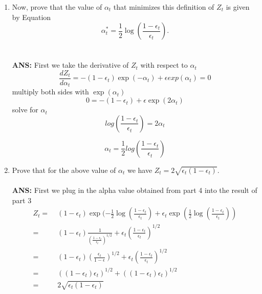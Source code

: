 \documentclass[english]{article}
\begin{document}
\begin{enumerate}
  For this special class of classifiers, first show that the
  normalizer $Z_t$ can be written as:
  \[
  Z_t = (1-\epsilon_t)\exp(-\alpha_t) + \epsilon_t\exp(\alpha_t).
  \]

  {\em Hint}: Consider the sums over correctly and incorrectly
  classified examples separately.
  \\\\
  {\bf ANS: } In this specific binary case that we are considering, if $h_t(x_i) = y_i$,
  \[
  Z_t(i) = \exp(-\alpha_t))
  \]
  else
  \[
  Z_t(i) = \exp(\alpha_t))
  \]
  
  $\epsilon_t$ picks out the terms that the decision stump gets wrong, so the part of Z which the decision stump made a mistake is $\epsilon_t \exp(\alpha_t)$. Since the weights $D$ must sum up to one, the part which the stump is then $(1-\epsilon_t)\exp(-\alpha_t)$. Add these two parts together, we get
  \[
  	Z_t = (1-\epsilon_t)\exp(-\alpha_t) + 			   \epsilon_t\exp(\alpha_t).
  \]


\item  Now, prove that the value of $\alpha_t$ that
  minimizes this definition of $Z_t$ is given by Equation
 \begin{equation}
    \alpha_t^* = \frac{1}{2}\log\left( \frac{1 - \epsilon_t}{\epsilon_t}
    \right).
  \end{equation}
  \\\\
  {\bf ANS: } First we take the derivative of $Z_t$ with respect to $\alpha_t$
  \[
  \frac{dZ_t}{d\alpha_t} = -(1-\epsilon_t) \exp(-\alpha_t) + \epsilon exp(\alpha_t) = 0
  \]
  multiply both sides with $\exp(\alpha_t)$
\[
0 = -(1-\epsilon_t) + \epsilon \exp(2\alpha_t)
\]
solve for $\alpha_t$
\[
log(\frac{1-\epsilon_t}{\epsilon_t}) = 2\alpha_t 
\]

\[
\alpha_t = \frac{1}{2}log(\frac{1-\epsilon_t}{\epsilon_t})
\]

\item Prove that for the above value of $\alpha_t$ we
  have $Z_t = 2\sqrt{\epsilon_t(1-\epsilon_t)}$.
\\\\
{\bf ANS: }First we plug in the alpha value obtained from part 4 into the result of part 3
\begin{align*}
Z_t =&\; (1-\epsilon_t) \exp(-\frac{1}{2} \log(\frac{1-\epsilon_t}{\epsilon_t}) + \epsilon_t \exp(\frac{1}{2} \log(\frac{1-\epsilon_t}{\epsilon_t}))
\\
=&\; (1-\epsilon_t) \frac{1}{(\frac{1-\epsilon_t}{\epsilon_t})^{1/2}} + \epsilon_t (\frac{1-\epsilon_t}{\epsilon_t})^{1/2}
\\
=&\; (1-\epsilon_t) (\frac{\epsilon_t}{1-\epsilon})^{1/2} + \epsilon_t (\frac{1-\epsilon_t}{\epsilon_t})^{1/2}
\\
=&\; ((1-\epsilon_t)\epsilon_t)^{1/2} + ((1-\epsilon_t)\epsilon_t)^{1/2}
\\
=&\; 2\sqrt{\epsilon_t(1-\epsilon_t)}
\end{align*}




\end{enumerate}
\end{document}
